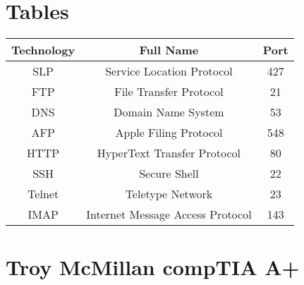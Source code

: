 \documentclass{article}
\begin{document}
\section{Tables}
\begin{tabular}{|c|c|c|}
\hline
    Technology & Full Name & Port \\
    \hline
   SLP  & Service Location Protocol & 427\\
   FTP & File Transfer Protocol & 21 \\
   DNS & Domain Name System & 53\\
   AFP & Apple Filing Protocol & 548 \\
   HTTP & HyperText Transfer Protocol & 80 \\
   SSH & Secure Shell & 22 \\
   Telnet & Teletype Network & 23\\
   IMAP & Internet Message Access Protocol & 143\\
   \hline
\end{tabular}



\section{Troy McMillan compTIA A+} 
\end{document}
